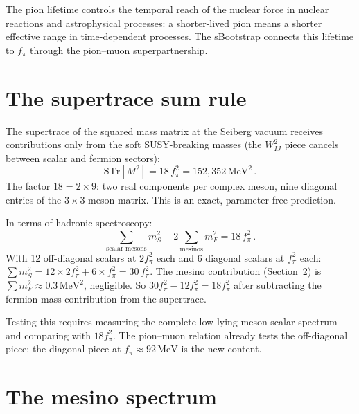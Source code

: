 \documentclass[12pt,a4paper]{article}
\newcommand{\MeV}{\,\text{MeV}}
\newcommand{\fpi}{f_\pi}
\begin{document}
The pion lifetime controls the temporal reach of the nuclear force
in nuclear reactions and astrophysical processes: a shorter-lived
pion means a shorter effective range in time-dependent processes.
The sBootstrap connects this lifetime to $\fpi$ through the
pion--muon superpartnership.

\section{The supertrace sum rule}
\label{sec:supertrace}

The supertrace of the squared mass matrix at the Seiberg vacuum
receives contributions only from the soft SUSY-breaking masses
(the $W_{IJ}^2$ piece cancels between scalar and fermion sectors):
\begin{equation}
  \boxed{
    \text{STr}[M^2] = 18\,\fpi^2 = 152{,}352\MeV^2\,.
  }
\end{equation}
The factor $18 = 2 \times 9$: two real components per complex meson,
nine diagonal entries of the $3 \times 3$ meson matrix.  This is an
exact, parameter-free prediction.

In terms of hadronic spectroscopy:
\begin{equation}
  \sum_{\text{scalar mesons}} m_S^2
  - 2\sum_{\text{mesinos}} m_F^2
  = 18\,\fpi^2\,.
\end{equation}
With 12 off-diagonal scalars at $2\fpi^2$ each and 6 diagonal scalars
at $\fpi^2$ each:
$\sum m_S^2 = 12 \times 2\fpi^2 + 6 \times \fpi^2 = 30\,\fpi^2$.
The mesino contribution (Section~\ref{sec:mesinos}) is
$\sum m_F^2 \approx 0.3\MeV^2$, negligible.  So
$30\fpi^2 - 12\fpi^2 = 18\fpi^2$ after subtracting the fermion
mass contribution from the supertrace.

Testing this requires measuring the complete low-lying meson scalar
spectrum and comparing with $18\fpi^2$.  The pion--muon relation
already tests the off-diagonal piece; the diagonal piece at
$\fpi \approx 92\MeV$ is the new content.

\section{The mesino spectrum}
\label{sec:mesinos}
\end{document}
